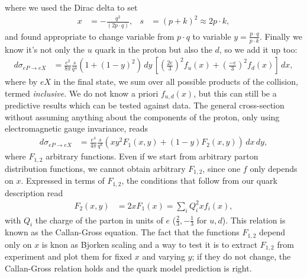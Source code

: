 \documentclass[relqm.tex]{subfiles}
\begin{document}
where we used the Dirac delta to set
\begin{align}
    x &= -\frac{q^2}{(2p\cdot q)}, & s &= (p+k)^2\approx 2p\cdot k,
\end{align}
and found appropriate to change variable from $p\cdot q$ to variable $y=\frac{p\cdot q}{p\cdot k}$.
Finally we know it's not only the $u$ quark in the proton but also the $d$, so we add it up too:
\begin{align}
    d\sigma_{eP\to eX} &= \frac{e^2}{8\pi}\frac{s}{q^4}\left(1+(1-y)^2\right)\,dy\,\left[\left(\frac{2e}{3}\right)^2f_u(x) + \left(\frac{-e}{3}\right)^2f_d(x)\right]\,dx,
\end{align}
where by $eX$ in the final state, we sum over all possible products of the collision, termed \emph{inclusive.}
We do not know a priori $f_{u,d}(x)$, but this can still be a predictive results which can be tested against data.
The general cross-section without assuming anything about the components of the proton, only using electromagnetic gauge invariance, reads
\begin{align}
    d\sigma_{eP\to eX} &= \frac{e^4}{4\pi}\frac{s}{q^4}\left(xy^2F_1(x,y) + (1-y)F_2(x,y)\right)\,dx\,dy,
\end{align}
where $F_{1,2}$ arbitrary functions. 
Even if we start from arbitrary parton distribution functions, we cannot obtain arbitrary $F_{1,2}$, since one $f$ only depends on $x$. 
Expressed in terms of $F_{1,2}$, the conditions that follow from our quark description read
\begin{align}
    F_2(x,y) &= 2xF_1(x) = \sum_i Q_i^2 xf_i(x),
\end{align}
with $Q_i$ the charge of the parton in units of $e$ ($\frac23,-\frac13$ for $u,d$).
This relation is known as the Callan-Gross equation. 
The fact that the functions $F_{1,2}$ depend only on $x$ is knon as Bjorken scaling and a way to test it is to extract $F_{1,2}$ from experiment and plot them for fixed $x$ and varying $y$; if they do not change, the Callan-Gross relation holds and the quark model prediction is right.
\end{document}
